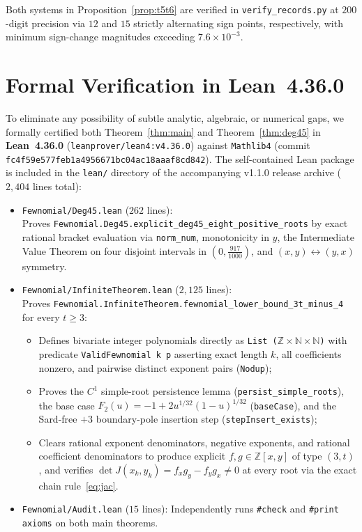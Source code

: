 \documentclass[11pt,a4paper]{amsart}
\theoremstyle{remark}
\newcommand{\Z}{\mathbb{Z}}
\begin{document}
Both systems in Proposition~\ref{prop:t5t6} are verified in \texttt{verify\_records.py} at $200$-digit precision via $12$ and $15$ strictly alternating sign points, respectively, with minimum sign-change magnitudes exceeding $7.6 \times 10^{-3}$.

\section{Formal Verification in Lean~4.36.0}\label{sec:lean}

To eliminate any possibility of subtle analytic, algebraic, or numerical gaps, we formally certified both Theorem~\ref{thm:main} and Theorem~\ref{thm:deg45} in \textbf{Lean~4.36.0} (\texttt{leanprover/lean4:v4.36.0}) against \texttt{Mathlib4} (commit \texttt{fc4f59e577feb1a4956671bc04ac18aaaf8cd842}). The self-contained Lean package is included in the \texttt{lean/} directory of the accompanying v1.1.0 release archive ($2{,}404$ lines total):

\begin{itemize}
  \item \texttt{Fewnomial/Deg45.lean} ($262$ lines):\\
  Proves \texttt{Fewnomial.Deg45.explicit\_deg45\_eight\_positive\_roots} by exact rational bracket evaluation via \texttt{norm\_num}, monotonicity in $y$, the Intermediate Value Theorem on four disjoint intervals in $(0, \tfrac{917}{1000})$, and $(x, y) \leftrightarrow (y, x)$ symmetry.
  \item \texttt{Fewnomial/InfiniteTheorem.lean} ($2{,}125$ lines):\\
  Proves \texttt{Fewnomial.InfiniteTheorem.fewnomial\_lower\_bound\_3t\_minus\_4} for every $t \ge 3$:
  \begin{itemize}
    \item Defines bivariate integer polynomials directly as \texttt{List ($\Z \times \mathbb{N} \times \mathbb{N}$)} with predicate \texttt{ValidFewnomial k p} asserting exact length $k$, all coefficients nonzero, and pairwise distinct exponent pairs (\texttt{Nodup});
    \item Proves the $C^1$ simple-root persistence lemma (\texttt{persist\_simple\_roots}), the base case $F_2(u) = -1 + 2 u^{1/32}(1-u)^{1/32}$ (\texttt{baseCase}), and the Sard-free $+3$ boundary-pole insertion step (\texttt{stepInsert\_exists});
    \item Clears rational exponent denominators, negative exponents, and rational coefficient denominators to produce explicit $f, g \in \Z[x, y]$ of type $(3, t)$, and verifies $\det J(x_k, y_k) = f_x g_y - f_y g_x \neq 0$ at every root via the exact chain rule~\eqref{eq:jac}.
  \end{itemize}
  \item \texttt{Fewnomial/Audit.lean} ($15$ lines): Independently runs \texttt{\#check} and \texttt{\#print axioms} on both main theorems.
\end{itemize}
\end{document}
